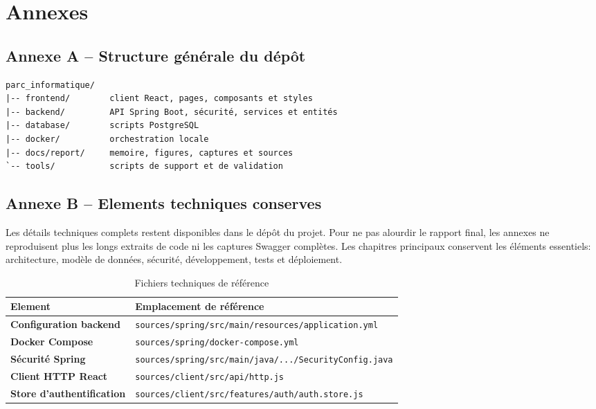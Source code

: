 ﻿\chapter{Annexes}

\section{Annexe A -- Structure générale du dépôt}
\begin{keybox}
\begin{verbatim}
parc_informatique/
|-- frontend/        client React, pages, composants et styles
|-- backend/         API Spring Boot, sécurité, services et entités
|-- database/        scripts PostgreSQL
|-- docker/          orchestration locale
|-- docs/report/     memoire, figures, captures et sources
`-- tools/           scripts de support et de validation
\end{verbatim}
\end{keybox}

\section{Annexe B -- Elements techniques conserves}
Les détails techniques complets restent disponibles dans le dépôt du projet. Pour ne pas alourdir le rapport final, les annexes ne reproduisent plus les longs extraits de code ni les captures Swagger complètes. Les chapitres principaux conservent les éléments essentiels: architecture, modèle de données, sécurité, développement, tests et déploiement.

\begin{table}[H]
\centering
\caption{Fichiers techniques de référence}
\begin{tabularx}{\textwidth}{>{\bfseries}p{4cm}X}
\toprule
Element & Emplacement de référence \\
\midrule
Configuration backend & \texttt{sources/spring/src/main/resources/application.yml} \\
Docker Compose & \texttt{sources/spring/docker-compose.yml} \\
Sécurité Spring & \texttt{sources/spring/src/main/java/.../SecurityConfig.java} \\
Client HTTP React & \texttt{sources/client/src/api/http.js} \\
Store d'authentification & \texttt{sources/client/src/features/auth/auth.store.js} \\
\bottomrule
\end{tabularx}
\end{table}

